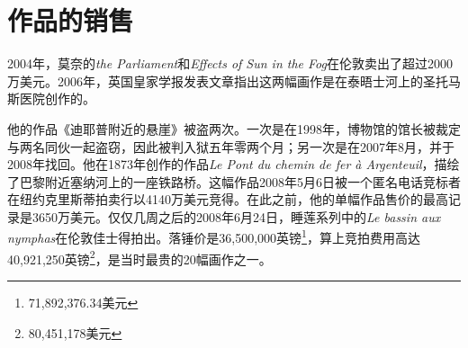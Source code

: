     \section{作品的销售}
        
        2004年，莫奈的\textit{the Parliament}和\textit{Effects of Sun in the Fog}在伦敦卖出了超过2000万美元。2006年，英国皇家学报发表文章指出这两幅画作是在泰晤士河上的圣托马斯医院创作的。
    
        他的作品《迪耶普附近的悬崖》被盗两次。一次是在1998年，博物馆的馆长被裁定与两名同伙一起盗窃，因此被判入狱五年零两个月；另一次是在2007年8月，并于2008年找回。他在1873年创作的作品\textit{Le Pont du chemin de fer \`a Argenteuil}，描绘了巴黎附近塞纳河上的一座铁路桥。这幅作品2008年5月6日被一个匿名电话竞标者在纽约克里斯蒂拍卖行以4140万美元竞得。在此之前，他的单幅作品售价的最高记录是3650万美元。仅仅几周之后的2008年6月24日，睡莲系列中的\textit{Le bassin aux nymphas}在伦敦佳士得拍出。落锤价是36,500,000英镑\footnote{71,892,376.34美元}，算上竞拍费用高达40,921,250英镑\footnote{80,451,178美元}，是当时最贵的20幅画作之一。
